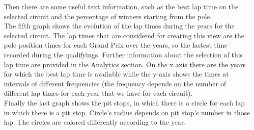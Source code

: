 \documentclass[11pt,twocolumn,letterpaper]{article}
\begin{document}
Then there are some useful text information, such as the best lap time on the selected circuit and the percentage of winners starting from the pole. \\
The fifth graph shows the evolution of the lap times during the years for the selected circuit. The lap times that are considered for creating this view are the pole position times for each Grand Prix over the years, so the fastest time recorded during the qualifyings. Further information about the selection of this lap time are provided in the Analytics section. On the x axis there are the years for which the best lap time is available while the y-axis shows the times at intervals of different frequencies (the frequency depends on the number of different lap times for each year that we have for each circuit). \\
Finally the last graph shows the pit stops, in which there is a circle for each lap in which there is a pit stop. Circle's radius depends on pit stop's number in those lap. The circles are colored differently according to the year.
\end{document}
